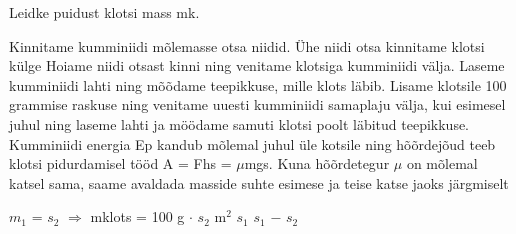 
Leidke puidust klotsi mass mk.

\hint

\solu
Kinnitame kumminiidi mõlemasse otsa niidid. Ühe niidi otsa kinnitame klotsi külge Hoiame niidi otsast kinni ning venitame klotsiga kumminiidi välja. Laseme kumminiidi lahti ning mõõdame teepikkuse, mille klots läbib. Lisame klotsile 100 grammise raskuse ning venitame uuesti kumminiidi samaplaju välja, kui esimesel juhul ning laseme lahti ja möödame samuti klotsi poolt läbitud teepikkuse. Kumminiidi energia Ep kandub mõlemal juhul üle kotsile ning hõõrdejõud teeb klotsi pidurdamisel tööd A = Fhs = $\mu$mgs. Kuna hõõrdetegur $\mu$ on mõlemal katsel sama, saame avaldada masside suhte esimese ja teise katse jaoks järgmiselt

$m_1$ = $s_2$ $\Rightarrow$ mklots = 100 g $\cdot$ $s_2$ m$^2$ $s_1$ $s_1$ $-$ $s_2$
\probend
